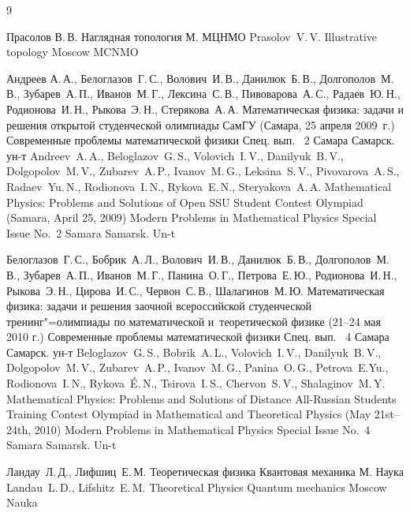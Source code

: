 \begin{thebibliography}{9}

\by Прасолов В.\,В.
\book Наглядная топология
\publaddr М.
\publ МЦНМО
\misctransl 
\by Prasolov~V.\,V.
\book  Illustrative topology
\publaddr Moscow
\publ MCNMO

\by Андреев А.\,А., Белоглазов~Г.\,С., Волович~И.\,В., Данилюк~Б.\,В., Долгополов~М.\,В., Зубарев~А.\,П., Иванов~М.\,Г., Лексина~С.\,В., Пивоварова~А.\,С., Радаев~Ю.\,Н., Родионова~И.\,Н., Рыкова~Э.\,Н., Стерякова~А.\,А.
\book Математическая физика: задачи и решения открытой студенческой олимпиады СамГУ (Самара, 25 апреля 2009~г.)
\serial Современные проблемы математической физики
\issueinfo Спец. вып. \No~2
\publaddr Самара
\publ Самарск. ун-т
\misctransl
\by Andreev~A.\,A., Beloglazov~G.\,S., Volovich~I.\,V., Danilyuk~B.\,V., Dolgopolov~M.\,V., Zubarev~A.\,P., Ivanov~M.\,G., Leksina~S.\,V., Pivovarova~A.\,S., Radaev~Yu.\,N., Rodionova~I.\,N., Rykova~E.\,N., Steryakova~A.\,A.
\book Mathematical Physics: Problems and Solutions of Open SSU Student Contest Olympiad (Samara, April 25, 2009)
\serial Modern Problems in Mathematical Physics
\issueinfo Special Issue No.~2
\publaddr Samara
\publ Samarsk. Un-t


\by  Белоглазов~Г.\,С., Бобрик~А.\,Л.,  Волович~И.\,В., Данилюк~Б.\,В., Долгополов~М.\,В., Зубарев~А.\,П., Иванов~М.\,Г.,  Панина~О.\,Г., Петрова~Е.\,Ю., Родионова~И.\,Н., Рыкова~Э.\,Н., Цирова~И.\,С., Червон~С.\,В., Шалагинов~М.\,Ю.
\book Математическая физика: задачи и решения заочной всероссийской студенческой тренинг"=олимпиады по математической и~теоретической физике (21–24 мая 2010 г.)
\serial Современные проблемы математической физики
\issueinfo Спец. вып. \No~4
\publaddr Самара
\publ Самарск. ун-т
\misctransl 
\by Beloglazov~G.\,S., Bobrik~A.\,L., Volovich~I.\,V., Danilyuk~B.\,V., Dolgopolov~M.\,V., Zubarev~A.\,P., Ivanov~M.\,G.,  Panina~O.\,G., Petrova~E.Yu., Rodionova~I.\,N., Rykova~\'E.\,N.,  Tsirova~I.\,S., Chervon~S.\,V.,
Shalaginov~M.\,Y. 
\book Mathematical Physics: Problems and Solutions of Distance All-Russian Students Training
Contest Olympiad in Mathematical and Theoretical Physics (May 21st–24th, 2010)
\serial Modern Problems in Mathematical Physics
\issueinfo Special Issue No.~4
\publaddr Samara
\publ Samarsk. Un-t


\by Ландау~Л.\,Д., Лифшиц~Е.\,М.
\book Теоретическая физика
\volinfo Квантовая механика
\publaddr М.
\publ Наука
\misctransl 
\by Landau~L.\,D., Lifshitz~E.\,M.
\book Theoretical Physics
\volinfo Quantum mechanics
\publaddr Moscow
\publ Nauka


\end{thebibliography}



\hskip6.5cm \thedate \par
\hskip6.5cm\therevdate\par


\makeengtitle

\newpage 

%
% 